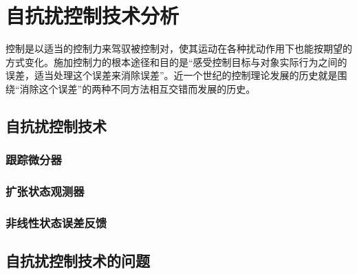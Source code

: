 \chapter{自抗扰控制技术分析}
	控制是以适当的控制力来驾驭被控制对，使其运动在各种扰动作用下也能按期望的方式变化。施加控制力的根本途径和目的是“感受控制目标与对象实际行为之间的误差，适当处理这个误差来消除误差”。近一个世纪的控制理论发展的历史就是围绕“消除这个误差”的两种不同方法相互交错而发展的历史。

\section{自抗扰控制技术}
\subsection{跟踪微分器}

\subsection{扩张状态观测器}

\subsection{非线性状态误差反馈}

\section{自抗扰控制技术的问题}

\subsection{}

\subsection{}